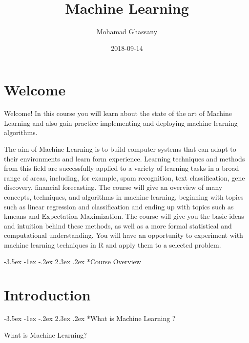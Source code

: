 \documentclass[]{book}
\title{Machine Learning}
\author{Mohamad Ghassany}
\date{2018-09-14}
\makeatletter
\renewcommand\section{\@startsection {section}{1}{\z@}%
                                   {-3.5ex \@plus -1ex \@minus -.2ex}%
                                   {2.3ex \@plus.2ex}%
                                   {\normalfont\Large\bfseries\color{ForestGreen}}}
\theoremstyle{definition}
\theoremstyle{definition}
\theoremstyle{definition}
\theoremstyle{remark}
\makeatother
\begin{document}
\maketitle

{
\setcounter{tocdepth}{2}
\tableofcontents
}
\chapter*{Welcome}\label{welcome}

Welcome! In this course you will learn about the state of the art of
Machine Learning and also gain practice implementing and deploying
machine learning algorithms.

The aim of Machine Learning is to build computer systems that can adapt
to their environments and learn form experience. Learning techniques and
methods from this field are successfully applied to a variety of
learning tasks in a broad range of areas, including, for example, spam
recognition, text classification, gene discovery, financial forecasting.
The course will give an overview of many concepts, techniques, and
algorithms in machine learning, beginning with topics such as linear
regression and classification and ending up with topics such as kmeans
and Expectation Maximization. The course will give you the basic ideas
and intuition behind these methods, as well as a more formal statistical
and computational understanding. You will have an opportunity to
experiment with machine learning techniques in R and apply them to a
selected problem.

\section*{Course Overview}\label{course-overview}

\chapter*{Introduction}\label{introduction}

\section*{What is Machine Learning ?}\label{what-is-machine-learning}

What is Machine Learning?
\end{document}
